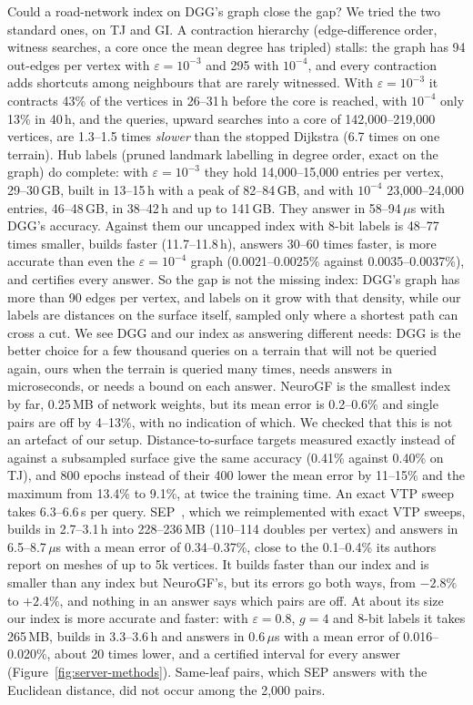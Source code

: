 \documentclass[sigconf,nonacm,screen]{acmart}
\newcommand{\eps}{\varepsilon}
\begin{document}
Could a road-network index on DGG's graph close the gap? We tried the two standard ones, on TJ and GI. A
contraction hierarchy (edge-difference order, witness searches, a core once the mean degree has tripled) stalls: the
graph has 94 out-edges per vertex with $\eps=10^{-3}$ and 295 with $10^{-4}$, and every contraction adds shortcuts
among neighbours that are rarely witnessed. With $\eps=10^{-3}$ it contracts 43\% of the vertices in 26--31\,h before
the core is reached, with $10^{-4}$ only 13\% in 40\,h, and the queries, upward searches into a core of 142,000--219,000
vertices, are 1.3--1.5 times \emph{slower} than the stopped Dijkstra (6.7 times on one terrain). Hub labels (pruned landmark labelling in degree order, exact
on the graph) do complete: with $\eps=10^{-3}$ they hold 14,000--15,000 entries per vertex, 29--30\,GB, built in
13--15\,h with a peak of 82--84\,GB, and with $10^{-4}$ 23,000--24,000 entries, 46--48\,GB, in 38--42\,h and up to
141\,GB. They answer in 58--94\,$\mu$s with DGG's accuracy. Against them our uncapped index with 8-bit labels is 48--77 times
smaller, builds faster (11.7--11.8\,h), answers 30--60 times faster, is more accurate than even the $\eps=10^{-4}$
graph (0.0021--0.0025\% against 0.0035--0.0037\%), and certifies every answer. So the gap is not the missing index: DGG's graph has more than 90 edges per vertex, and
labels on it grow with that density, while our labels are distances on the surface itself, sampled only where a
shortest path can cross a cut.
We see DGG and our index as answering different needs:
DGG is the better choice for a few thousand queries on a terrain that will not be queried again, ours when the terrain is
queried many times, needs answers in microseconds, or needs a bound on each answer.
NeuroGF is the smallest index by far, 0.25\,MB of network weights, but its mean error is 0.2--0.6\% and single
pairs are off by 4--13\%, with no indication of which. We checked that this is not an artefact of our setup.
Distance-to-surface targets measured exactly instead of against a subsampled surface give the same accuracy (0.41\%
against 0.40\% on TJ), and 800 epochs instead of their 400 lower the mean error by 11--15\% and the maximum from 13.4\%
to 9.1\%, at twice the training time. An exact VTP sweep takes 6.3--6.6\,s per query.
SEP~\cite{gotsman2022compressing}, which we reimplemented with exact VTP sweeps, builds in 2.7--3.1\,h into
228--236\,MB (110--114 doubles per vertex) and answers in 6.5--8.7\,$\mu$s with a mean error of 0.34--0.37\%, close to
the 0.1--0.4\% its authors report on meshes of up to 5k vertices. It builds faster than our index and is smaller than
any index but NeuroGF's, but its errors go both ways, from $-2.8\%$ to $+2.4\%$, and nothing in an answer says which
pairs are off. At about its size our index is more accurate and faster: with $\eps=0.8$, $g=4$ and 8-bit labels it
takes 265\,MB, builds in 3.3--3.6\,h and answers in 0.6\,$\mu$s with a mean error of 0.016--0.020\%, about 20 times lower, and
a certified interval for every answer (Figure~\ref{fig:server-methods}). Same-leaf pairs, which SEP answers with the Euclidean distance, did not occur among
the 2,000 pairs.
\end{document}
